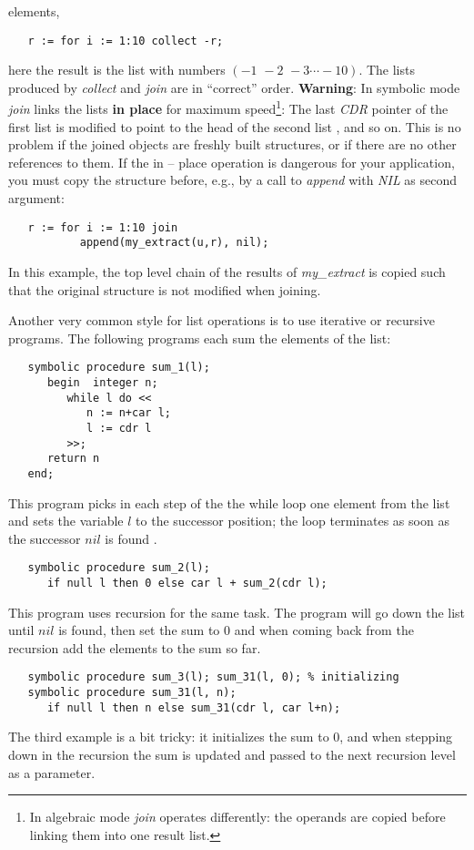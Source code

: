 \documentclass[11pt]{article}
\begin{document}
elements,
\begin{verbatim}
   r := for i := 1:10 collect -r;
\end{verbatim}
here the result is the list with numbers $(-1\,\, -2\,\, -3 \cdots -10)$.
The lists produced by \emph{collect} and \emph{join} are in ``correct''
order.
\textbf{Warning}: In symbolic mode  \emph{join} links the lists
\textbf{in place} for maximum speed\footnote{In algebraic mode \emph{join} operates differently: the operands
are copied before linking them into one result list.}:
The last \emph{CDR} pointer  of the first list is modified to
point to the head of the second list , and so on.
This is no problem if the joined objects are freshly built
structures, or if there are no other references to them.
If the in -- place operation is dangerous for your application,
you must copy the structure before, e.g., by a call to \emph{append}
with \emph{NIL} as second argument:
\begin{verbatim}
   r := for i := 1:10 join
           append(my_extract(u,r), nil);
\end{verbatim}
In this example, the top level chain of the results of \emph{my\_extract}
is copied such that the original structure is not modified when
joining.


Another very common style for list operations is to use
iterative or recursive programs. The following programs each
sum the elements of the list:
\begin{verbatim}
   symbolic procedure sum_1(l);
      begin  integer n;
         while l do <<
            n := n+car l;
            l := cdr l
         >>;
      return n
   end;
\end{verbatim}
This program picks in each step of the the while loop one
element from the list and sets the variable $l$ to
the successor position; the loop terminates as soon as the
successor $nil$ is found .
\begin{verbatim}
   symbolic procedure sum_2(l);
      if null l then 0 else car l + sum_2(cdr l);
\end{verbatim}
This program uses recursion for the same task.
The program will go down the list until $nil$ is found,
then set the sum to $0$ and when coming back from the
recursion add the elements to the sum so far.
\begin{verbatim}
   symbolic procedure sum_3(l); sum_31(l, 0); % initializing
   symbolic procedure sum_31(l, n);
      if null l then n else sum_31(cdr l, car l+n);
\end{verbatim}
The third example is a bit tricky: it initializes
the sum to 0, and when stepping down in the
recursion the sum is updated and passed to the next
recursion level as a parameter.
\end{document}
